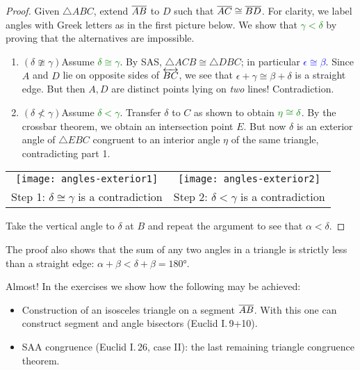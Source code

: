 \begin{proof}
	Given $\triangle ABC$, extend $\overline{AB}$ to $D$ such that \textcolor{blue}{$\overline{AC}\cong\overline{BD}$}. For clarity, we label angles with Greek letters as in the first picture below. We show that \textcolor{Green}{$\gamma<\delta$} by proving that the alternatives are impossible.	
	\begin{enumerate}\itemsep0pt
		\item $(\delta\ncong\gamma)$\lstsp Assume \textcolor{Green}{$\delta\cong\gamma$}. By SAS, $\triangle ACB\cong\triangle DBC$; in particular \textcolor{blue}{$\epsilon\cong\beta$}. Since $A$ and $D$ lie on opposite sides of $\overleftrightarrow{BC}$, we see that $\epsilon+\gamma\cong \beta+\delta$ is a straight edge. But then $A,D$ are distinct points lying on \emph{two} lines! Contradiction.
		\item $(\delta\not<\gamma)$\lstsp Assume \textcolor{Green}{$\delta<\gamma$}. Transfer $\delta$ to $C$ as shown to obtain $\textcolor{Green}{\eta\cong\delta}$. By the crossbar theorem, we obtain an intersection point $E$. But now $\delta$ is an exterior angle of $\triangle EBC$ congruent to an interior angle $\eta$ of the same triangle, contradicting part 1.
	\end{enumerate}
	\begin{center}
		\begin{tabular}{c@{\qquad}c}
			\texttt{[image: angles-exterior1]}
			&
			\texttt{[image: angles-exterior2]}
			\\
			Step 1: $\delta\cong\gamma$ is a contradiction
			&
			Step 2: $\delta<\gamma$ is a contradiction
		\end{tabular}
	\end{center}
	Take the vertical angle to $\delta$ at $B$ and repeat the argument to see that $\alpha<\delta$.
\end{proof}

The proof also shows that the sum of any two angles in a triangle is strictly less than a straight edge: $\alpha+\beta<\delta+\beta =\ang{180}$.

\goodbreak


Almost! In the exercises we show how the following may be achieved:
\begin{itemize}
  \item Construction of an isosceles triangle on a segment $\overline{AB}$. With this one can construct segment and angle bisectors (Euclid I.\,9+10).
  \item SAA congruence (Euclid I.\,26, case II): the last remaining triangle congruence theorem.
\end{itemize}

